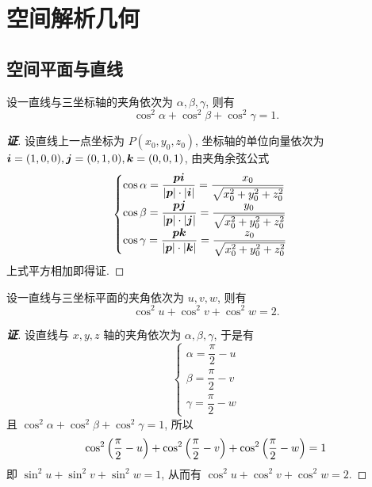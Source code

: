 \section{空间解析几何}

\subsection{空间平面与直线}

\begin{theorem}[线轴夹角余弦平方和公式]
    设一直线与三坐标轴的夹角依次为 $\alpha,\beta,\gamma$, 则有 $$\cos^2\alpha+\cos^2\beta+\cos^2\gamma=1.$$
\end{theorem}
\begin{proof}[{\songti \textbf{证}}]
    设直线上一点坐标为 $P(x_0,y_0,z_0)$, 坐标轴的单位向量依次为 $\vb*{i}=(1,0,0),\vb*{j}=(0,1,0),\vb*{k}=(0,0,1)$, 由夹角余弦公式
    $$\begin{cases}
        \cos\alpha=\dfrac{\vb*{pi}}{|\vb*{p}|\cdot|\vb*{i}|}=\dfrac{x_0}{\sqrt{x_0^2+y_0^2+z_0^2}}\\
        \cos\beta=\dfrac{\vb*{pj}}{|\vb*{p}|\cdot|\vb*{j}|}=\dfrac{y_0}{\sqrt{x_0^2+y_0^2+z_0^2}}\\
        \cos\gamma=\dfrac{\vb*{pk}}{|\vb*{p}|\cdot|\vb*{k}|}=\dfrac{z_0}{\sqrt{x_0^2+y_0^2+z_0^2}}\\
    \end{cases}
    $$
    上式平方相加即得证.
\end{proof}

\begin{theorem}[线面夹角余弦平方和公式]
    设一直线与三坐标平面的夹角依次为 $u,v,w$, 则有 $$\cos^2u+\cos^2v+\cos^2w=2.$$
\end{theorem}
\begin{proof}[{\songti \textbf{证}}]
    设直线与 $x,y,z$ 轴的夹角依次为 $\alpha,\beta,\gamma$, 于是有 
    $$\begin{cases}
        \alpha=\dfrac{\pi}{2}-u\\[6pt]\beta=\dfrac{\pi}{2}-v\\[6pt]\gamma=\dfrac{\pi}{2}-w
    \end{cases}$$
    且 $\cos^2\alpha+\cos^2\beta+\cos^2\gamma=1$, 所以 
    $$\cos^2\qty(\dfrac{\pi}{2}-u)+\cos^2\qty(\dfrac{\pi}{2}-v)+\cos^2\qty(\dfrac{\pi}{2}-w)=1$$
    即 $\sin^2u+\sin^2v+\sin^2w=1$, 从而有 $\cos^2u+\cos^2v+\cos^2w=2.$
\end{proof}

